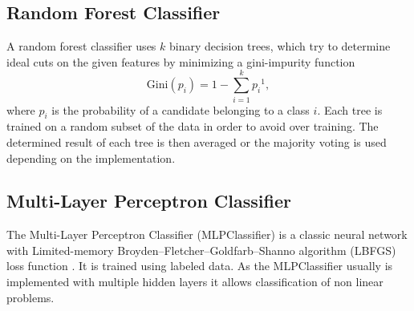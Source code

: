 \subsection{Random Forest Classifier}
A random forest classifier uses $k$ binary decision trees, which try to determine ideal cuts on the given features by minimizing a gini-impurity function
\begin{equation*}
	\mathrm{Gini}(p_i) = 1 - \sum_{i=1}^{k}{p_i}^1,
\end{equation*}
where $p_i$ is the probability of a candidate belonging to a class $i$.
Each tree is trained on a random subset of the data in order to avoid over training. 
The determined result of each tree is then averaged or the majority voting is used depending on the implementation. 

\subsection{Multi-Layer Perceptron Classifier}
The Multi-Layer Perceptron Classifier (MLPClassifier) is a classic neural network with Limited-memory Broyden–Fletcher–Goldfarb–Shanno algorithm (LBFGS) loss function \cite{Lossfueicecube}. It is trained using labeled data. As the MLPClassifier usually is implemented with multiple hidden layers it allows classification of non linear problems.

